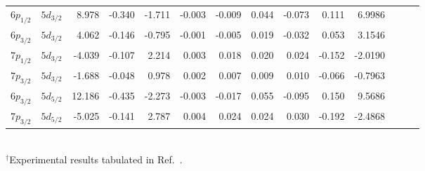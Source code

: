 \documentclass[10pt,twocolumn,a4paper]{article}%
\begin{document}
\begin{table}[p]
\begin{tabular}{rr rrrrrrrrr D{.}{.}{2.7} rr}
$6p_{1/2}$  & $5d_{3/2}$ & 8.978   & -0.340 & -1.711 & -0.003 & -0.009 & 0.044  & -0.073 & 0.111  & 6.9986   &             &         &          \\
$6p_{3/2}$  & $5d_{3/2}$ & 4.062   & -0.146 & -0.795 & -0.001 & -0.005 & 0.019  & -0.032 & 0.053  & 3.1546   &             &         &          \\
$7p_{1/2}$ & $5d_{3/2}$ & -4.039  & -0.107 & 2.214  & 0.003  & 0.018  & 0.020  & 0.024  & -0.152 & -2.0190  &             &         &          \\
$7p_{3/2}$ & $5d_{3/2}$ & -1.688  & -0.048 & 0.978  & 0.002  & 0.007  & 0.009  & 0.010  & -0.066 & -0.7963  &             &         &          \\
$6p_{3/2}$  & $5d_{5/2}$ & 12.186  & -0.435 & -2.273 & -0.003 & -0.017 & 0.055  & -0.095 & 0.150  & 9.5686   &             &         &          \\
$7p_{3/2}$ & $5d_{5/2}$ & -5.025  & -0.141 & 2.787  & 0.004  & 0.024  & 0.024  & 0.030  & -0.192 & -2.4868  &             &         &         \\
\hline
\hline     
\end{tabular}\\
$^\dag${\footnotesize Experimental results tabulated in Ref.~\cite{TohBeta2019}.}
\end{table}
\end{document}
